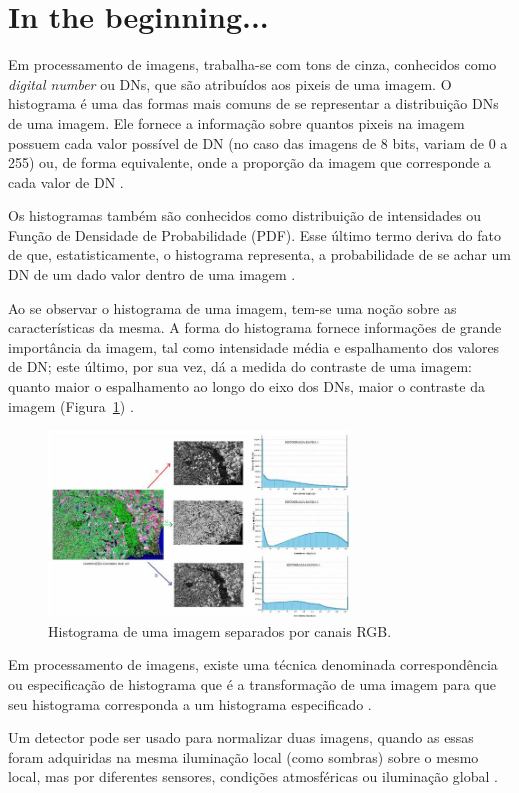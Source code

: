 \section*{In the beginning...}
Em processamento de imagens, trabalha-se com tons de cinza, conhecidos como \textit{digital number} ou DNs, que são atribuídos aos pixeis de uma imagem. O histograma é uma das formas mais comuns de se representar a distribuição DNs de uma imagem. Ele fornece a informação sobre quantos pixeis na imagem possuem cada valor possível de DN (no caso das imagens de 8 bits, variam de 0 a 255) ou, de forma equivalente, onde a proporção da imagem que corresponde a cada valor de DN \cite{hist}.

Os histogramas também são conhecidos como distribuição de intensidades ou Função de Densidade de Probabilidade (PDF). Esse último termo deriva do fato de que, estatisticamente, o histograma representa, a probabilidade de se achar um DN de um dado valor dentro de uma imagem \cite{hist}.

Ao se observar o histograma de uma imagem, tem-se uma noção sobre as características da mesma. A forma do histograma fornece informações de grande importância da imagem, tal como intensidade média e espalhamento dos valores de DN; este último, por sua vez, dá a medida do contraste de uma imagem: quanto maior o espalhamento ao longo do eixo dos DNs, maior o contraste da imagem (Figura~\ref{fig:hist}) \cite{hist}.

\begin{figure}[h]
    \centering
    \includegraphics[width=8cm]{imagem28.JPG}
    \caption{Histograma de uma imagem separados por canais RGB.}
    \label{fig:hist}
\end{figure}

Em processamento de imagens, existe uma técnica denominada correspondência ou especificação de histograma que é a transformação de uma imagem para que seu histograma corresponda a um histograma especificado \cite{wiki}. 

Um detector pode ser usado para normalizar duas imagens, quando as essas foram adquiridas na mesma iluminação local (como sombras) sobre o mesmo local, mas por diferentes sensores, condições atmosféricas ou iluminação global \cite{wiki}.

